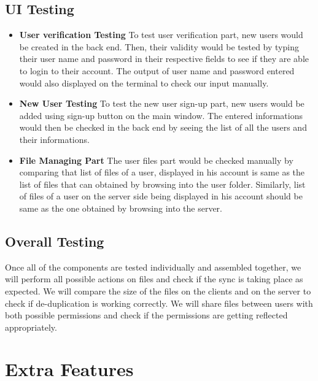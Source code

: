 \documentclass{article}
\begin{document}
			\subsection{UI Testing}
				\begin{itemize}
					\item \textbf{User verification Testing}
						\newline
						To test user verification part, new users would be created in the back end. Then, their validity would be tested by typing their user name and password in their respective fields to see if they are able to login to their account. The output of user name and password entered would also displayed on the terminal to check our input manually. 
					\item \textbf{New User Testing}
						\newline
						To test the new user sign-up part, new users would be added using sign-up button on the main window. The entered informations would then be checked in the back end by seeing the list of all the users and their informations. 
					\item \textbf{File Managing Part}
						\newline
						The user files part would be checked manually by comparing that list of files of a user, displayed in his account is same as the list of files that can obtained by browsing into the user folder. Similarly, list of files of a user on the server side being displayed in his account should be same as the one obtained by browsing into the server.
				\end{itemize}
			\subsection{Overall Testing}
				Once all of the components are tested individually and assembled together, we will perform all possible actions on files and check if the sync is taking place as expected. We will compare the size of the files on the clients and on the server to check if de-duplication is working correctly. We will share files between users with both possible permissions and check if the permissions are getting reflected appropriately.

	\section{Extra Features}
\end{document}
